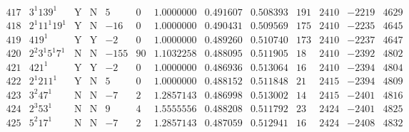 \documentclass[11pt,reqno,a4letter]{article}
\numberwithin{equation}{section}
\numberwithin{figure}{section}
\numberwithin{table}{section}
\theoremstyle{plain}
\numberwithin{theorem}{section}
\theoremstyle{definition}
\begin{document}
\begin{table}[ht]
\begin{equation*}
{\begin{array}{cc|cc|ccc|cc|cccc}
 417 & 3^1 139^1 & \text{Y} & \text{N} & 5 & 0 & 1.0000000 & 0.491607 & 0.508393 & 191 & 2410 & -2219 & 4629 \\
 418 & 2^1 11^1 19^1 & \text{Y} & \text{N} & -16 & 0 & 1.0000000 & 0.490431 & 0.509569 & 175 & 2410 & -2235 & 4645 \\
 419 & 419^1 & \text{Y} & \text{Y} & -2 & 0 & 1.0000000 & 0.489260 & 0.510740 & 173 & 2410 & -2237 & 4647 \\
 420 & 2^2 3^1 5^1 7^1 & \text{N} & \text{N} & -155 & 90 & 1.1032258 & 0.488095 & 0.511905 & 18 & 2410 & -2392 & 4802 \\
 421 & 421^1 & \text{Y} & \text{Y} & -2 & 0 & 1.0000000 & 0.486936 & 0.513064 & 16 & 2410 & -2394 & 4804 \\
 422 & 2^1 211^1 & \text{Y} & \text{N} & 5 & 0 & 1.0000000 & 0.488152 & 0.511848 & 21 & 2415 & -2394 & 4809 \\
 423 & 3^2 47^1 & \text{N} & \text{N} & -7 & 2 & 1.2857143 & 0.486998 & 0.513002 & 14 & 2415 & -2401 & 4816 \\
 424 & 2^3 53^1 & \text{N} & \text{N} & 9 & 4 & 1.5555556 & 0.488208 & 0.511792 & 23 & 2424 & -2401 & 4825 \\
 425 & 5^2 17^1 & \text{N} & \text{N} & -7 & 2 & 1.2857143 & 0.487059 & 0.512941 & 16 & 2424 & -2408 & 4832 \\
\end{array}
}
\end{equation*}
\clearpage 

\end{table} 

\newpage
\end{document}
